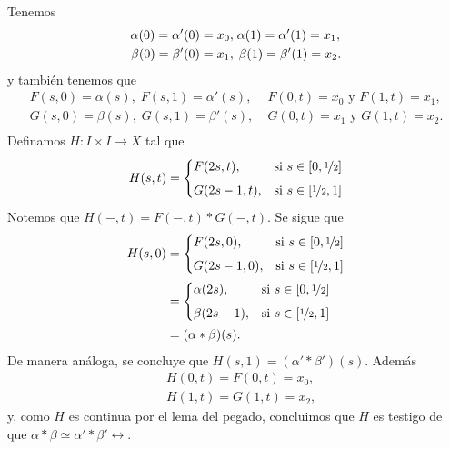     \begin{dem}
        Tenemos 
        \begin{align*}
            \alpha(0)=\alpha'(0)=x_0,&\; \alpha(1)=\alpha'(1)=x_1,\\
            \beta(0)=\beta'(0)=x_1,&\;\hspace{0.5mm}
            \beta(1)=\beta'(1)=x_2.
        \end{align*}
        y también tenemos que
        \begin{align*}
            F(s,0)=\alpha(s),\; F(s,1)=\alpha'(s),&\; F(0,t)=x_0 \text{ y } F(1,t)=x_1,\\
            G(s,0)=\beta(s),\; G(s,1)=\beta'(s),&\; G(0,t)=x_1 \text{ y } G(1,t)=x_2.\\
        \end{align*}
        Definamos $H:I\times I\to X$ tal que 
    \begin{equation*}
        H(s,t)  =
    \begin{cases} 
        F(2s,t), & \text{si } s\in [0,\nicefrac{1}{2}] \\[1ex]
        G(2s-1,t), & \text{si } s \in [\nicefrac{1}{2},1]
    \end{cases}
    \end{equation*}
        Notemos que $H(-,t)=F(-,t)*G(-,t)$. Se sigue que 
        \begin{align*}
        H(s,0) &= 
     \begin{cases} 
        F(2s,0), & \text{si } s\in [0,\nicefrac{1}{2}] \\[1ex]
        G(2s-1,0), & \text{si } s \in [\nicefrac{1}{2},1]
    \end{cases}\\
    &= 
     \begin{cases} 
        \alpha(2s), & \text{si } s\in [0,\nicefrac{1}{2}] \\[1ex]
       \beta(2s-1), & \text{si } s \in [\nicefrac{1}{2},1]
    \end{cases}\\
    &=(\alpha*\beta)(s).
    \end{align*}
    De manera análoga, se concluye que $H(s,1)=(\alpha'*\beta')(s)$. Además
    \begin{align*}
        &H(0,t)=F(0,t)=x_0,\\
        &H(1,t)=G(1,t)=x_2,
    \end{align*}
    y, como $H$ es continua por el lema del pegado, concluimos que $H$ es testigo de que $\alpha*\beta\simeq \alpha'*\beta'\rel$.
    \end{dem}
